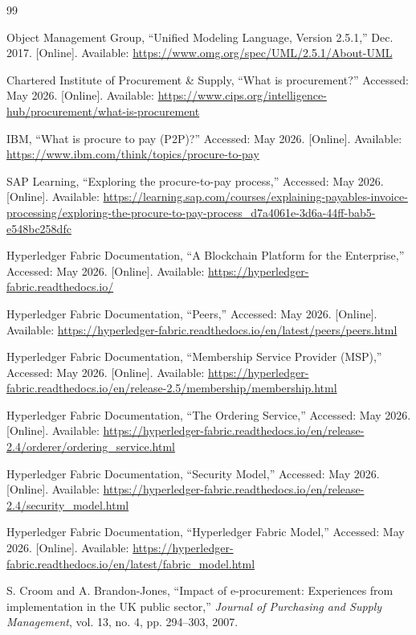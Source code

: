 \documentclass[conference]{IEEEtran}
\begin{document}
\begin{thebibliography}{99}

 Object Management Group, ``Unified Modeling Language, Version 2.5.1,'' Dec. 2017. [Online]. Available: \url{https://www.omg.org/spec/UML/2.5.1/About-UML}

 Chartered Institute of Procurement \& Supply, ``What is procurement?'' Accessed: May 2026. [Online]. Available: \url{https://www.cips.org/intelligence-hub/procurement/what-is-procurement}

 IBM, ``What is procure to pay (P2P)?'' Accessed: May 2026. [Online]. Available: \url{https://www.ibm.com/think/topics/procure-to-pay}

 SAP Learning, ``Exploring the procure-to-pay process,'' Accessed: May 2026. [Online]. Available: \url{https://learning.sap.com/courses/explaining-payables-invoice-processing/exploring-the-procure-to-pay-process_d7a4061e-3d6a-44ff-bab5-e548bc258dfc}

 Hyperledger Fabric Documentation, ``A Blockchain Platform for the Enterprise,'' Accessed: May 2026. [Online]. Available: \url{https://hyperledger-fabric.readthedocs.io/}

 Hyperledger Fabric Documentation, ``Peers,'' Accessed: May 2026. [Online]. Available: \url{https://hyperledger-fabric.readthedocs.io/en/latest/peers/peers.html}

 Hyperledger Fabric Documentation, ``Membership Service Provider (MSP),'' Accessed: May 2026. [Online]. Available: \url{https://hyperledger-fabric.readthedocs.io/en/release-2.5/membership/membership.html}

 Hyperledger Fabric Documentation, ``The Ordering Service,'' Accessed: May 2026. [Online]. Available: \url{https://hyperledger-fabric.readthedocs.io/en/release-2.4/orderer/ordering_service.html}

 Hyperledger Fabric Documentation, ``Security Model,'' Accessed: May 2026. [Online]. Available: \url{https://hyperledger-fabric.readthedocs.io/en/release-2.4/security_model.html}

 Hyperledger Fabric Documentation, ``Hyperledger Fabric Model,'' Accessed: May 2026. [Online]. Available: \url{https://hyperledger-fabric.readthedocs.io/en/latest/fabric_model.html}

 S. Croom and A. Brandon-Jones, ``Impact of e-procurement: Experiences from implementation in the UK public sector,'' \emph{Journal of Purchasing and Supply Management}, vol. 13, no. 4, pp. 294--303, 2007.


\end{thebibliography}
\end{document}
